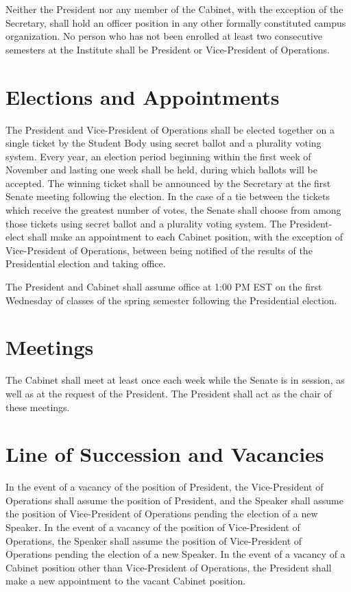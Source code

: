 \documentclass[12pt,oneside]{scrreprt}
\begin{document}
Neither the President nor any member of the Cabinet, with the exception of the Secretary, shall hold an officer position in any other formally constituted campus organization. No person who has not been enrolled at least two consecutive semesters at the Institute shall be President or Vice-President of Operations.

\section{Elections and Appointments}
The President and Vice-President of Operations shall be elected together on a single ticket by the Student Body using secret ballot and a plurality voting system. Every year, an election period beginning within the first week of November and lasting one week shall be held, during which ballots will be accepted. The winning ticket shall be announced by the Secretary at the first Senate meeting following the election. In the case of a tie between the tickets which receive the greatest number of votes, the Senate shall choose from among those tickets using secret ballot and a plurality voting system. The President-elect shall make an appointment to each Cabinet position, with the exception of Vice-President of Operations, between being notified of the results of the Presidential election and taking office.

The President and Cabinet shall assume office at 1:00 PM EST on the first Wednesday of classes of the spring semester following the Presidential election.

\section{Meetings}
The Cabinet shall meet at least once each week while the Senate is in session, as well as at the request of the President. The President shall act as the chair of these meetings.

\section{Line of Succession and Vacancies}
In the event of a vacancy of the position of President, the Vice-President of Operations shall assume the position of President, and the Speaker shall assume the position of Vice-President of Operations pending the election of a new Speaker. In the event of a vacancy of the position of Vice-President of Operations, the Speaker shall assume the position of Vice-President of Operations pending the election of a new Speaker. In the event of a vacancy of a Cabinet position other than Vice-President of Operations, the President shall make a new appointment to the vacant Cabinet position.
\end{document}
